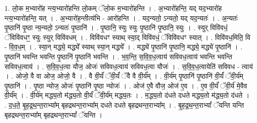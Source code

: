 \documentclass[17pt]{extarticle}
\begin{document}
1. लो॒क म॒भ्यारो॑ह न्त्य॒भ्यारो॑हन्ति लो॒कम् ॅलो॒क म॒भ्यारो॑हन्ति । . अ॒भ्यारो॑हन्ति॒ यद् यद॒भ्यारो॑ह न्त्य॒भ्यारो॑हन्ति॒ यत् । . अ॒भ्यारो॑ह॒न्तीत्य॑भि - आरो॑हन्ति । . यद॒न्यतो॒ ऽन्यतो॒ यद् यद॒न्यतः॑ । . अ॒न्यतः॑ पृ॒ष्ठानि॑ पृ॒ष्ठा न्य॒न्यतो॒ ऽन्यतः॑ पृ॒ष्ठानि॑ । . पृ॒ष्ठानि॒ स्युः स्युः पृ॒ष्ठानि॑ पृ॒ष्ठानि॒ स्युः । . स्युर् विवि॑वधं॒ ॅविवि॑वधꣳ॒॒ स्युः स्युर् विवि॑वधम् । . विवि॑वधꣳ स्याथ् स्या॒द् विवि॑वधं॒ ॅविवि॑वधꣳ स्यात् । . विवि॑वध॒मिति॒ वि - वि॒व॒ध॒म् । . स्या॒न् मद्ध्ये॒ मद्ध्ये᳚ स्याथ् स्या॒न् मद्ध्ये᳚ । . मद्ध्ये॑ पृ॒ष्ठानि॑ पृ॒ष्ठानि॒ मद्ध्ये॒ मद्ध्ये॑ पृ॒ष्ठानि॑ । . पृ॒ष्ठानि॑ भवन्ति भवन्ति पृ॒ष्ठानि॑ पृ॒ष्ठानि॑ भवन्ति । . भ॒व॒न्ति॒ स॒वि॒व॒ध॒त्वाय॑ सविवध॒त्वाय॑ भवन्ति भवन्ति सविवध॒त्वाय॑ । . स॒वि॒व॒ध॒त्वा यौज॒ ओजः॑ सविवध॒त्वाय॑ सविवध॒त्वा यौजः॑ । . स॒वि॒व॒ध॒त्वायेति॑ सविवध - त्वाय॑ । . ओजो॒ वै वा ओज॒ ओजो॒ वै । . वै वी॒र्यं॑ ॅवी॒र्यं॑ ॅवै वै वी॒र्य᳚म् । . वी॒र्य॑म् पृ॒ष्ठानि॑ पृ॒ष्ठानि॑ वी॒र्यं॑ ॅवी॒र्य॑म् पृ॒ष्ठानि॑ । . पृ॒ष्ठा न्योज॒ ओजः॑ पृ॒ष्ठानि॑ पृ॒ष्ठा न्योजः॑ । . ओज॑ ए॒वै वौज॒ ओज॑ ए॒व । . ए॒व वी॒र्यं॑ ॅवी॒र्य॑ मे॒वैव वी॒र्य᳚म् । . वी॒र्य॑म् मद्ध्य॒तो म॑द्ध्य॒तो वी॒र्यं॑ ॅवी॒र्य॑म् मद्ध्य॒तः । . म॒द्ध्य॒तो द॑धते दधते मद्ध्य॒तो म॑द्ध्य॒तो द॑धते । . द॒ध॒ते॒ बृ॒ह॒द्र॒थ॒न्त॒राभ्या᳚म् बृहद्रथन्त॒राभ्या᳚म् दधते दधते बृहद्रथन्त॒राभ्या᳚म् । . बृ॒ह॒द्र॒थ॒न्त॒राभ्यां᳚ ॅयन्ति यन्ति बृहद्रथन्त॒राभ्या᳚म् बृहद्रथन्त॒राभ्यां᳚ ॅयन्ति । \newline
\end{document}
